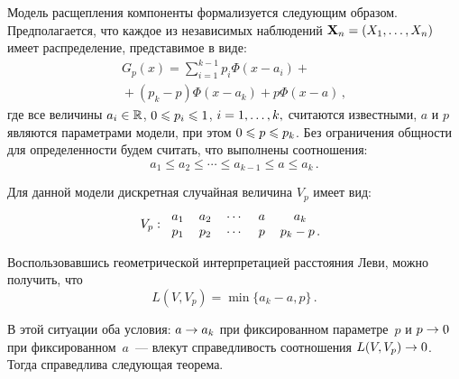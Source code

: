 \begin{multicols}{2}
Модель расщепления компоненты формализуется следующим образом.
Предполагается, что каждое из независимых наблюдений
$\mathbf{X}_n\hm=(X_1,\ldots,X_n)$ имеет распределение,
представимое в виде:
\begin{multline}
\label{Stab_G_p2}
G_p(x)=\sum\limits_{i=1}^{k-1}
p_i\Phi(x-a_i)+{}\\
{}+(p_k-p)\Phi(x-a_k)+p\Phi(x-a)\,,
\end{multline}
где все величины $a_i\hm\in\R$, $0\hm\leqslant p_i\hm\leqslant 1$, $i\hm=1,\ldots,k,$ считаются
известными, $a$ и $p$ являются параметрами модели, при этом
$0\hm\leqslant p\hm\leqslant p_k$. Без ограничения общности для
определенности будем считать, что выполнены соотношения:
\begin{equation}
\label{Stab_sigma2}
a_1\leqslant a_2\leqslant\cdots\leqslant a_{k-1}\leqslant a\leqslant a_k\,.
\end{equation}

Для данной модели дискретная случайная величина $V_p$ имеет вид:
\begin{equation}
\label{Stab_V_p2} 
V_p:
\begin{tabular}{ccccc}
$a_1$&$a_2$&$\cdots$&$a$&$a_k$\\
$p_1$&$p_2$&$\cdots$&$p$&$p_k-p$\,.
\end{tabular}
\end{equation}

Воспользовавшись геометрической интерпретацией расстояния Леви,
можно получить, что
\begin{equation}
\label{Stab_L2} 
L(V,V_p)=\min\{a_k-a,p\}\,.
\end{equation}

В этой ситуации оба условия: $a\hm\to a_k$ при фиксированном
параметре~$p$ и $p\hm\to 0$ при фиксированном~$a$~--- влекут
справедливость соотношения $L(V,V_p)\hm\to 0$. Тогда справедлива
следующая тео\-рема.

\medskip


\end{multicols}
